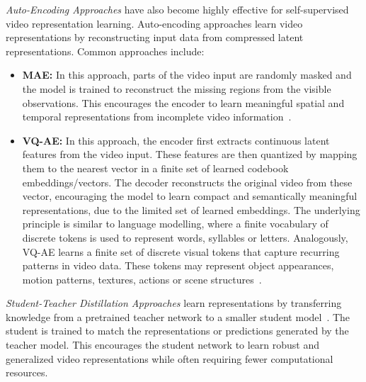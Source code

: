 \textit{Auto-Encoding Approaches} have also become highly effective for self-supervised video representation learning. Auto-encoding approaches learn video representations by reconstructing input data from compressed latent representations. Common approaches include:
\begin{itemize}
    \item \textbf{\ac{MAE}:} In this approach, parts of the video input are randomly masked and the model is trained to reconstruct the missing regions from the visible observations. This encourages the encoder to learn meaningful spatial and temporal representations from incomplete video information~\cite{Wang2023VideoMAEVS, Tong2022VideoMAEMA, Girdhar2022OmniMAESM}.
    
    \item \textbf{\ac{VQ-AE}:} 
    In this approach, the encoder first extracts continuous latent features from the video input. 
    These features are then quantized by mapping them to the nearest vector in a finite set of learned codebook embeddings/vectors. 
    The decoder reconstructs the original video from these vector, encouraging the model to learn compact and semantically meaningful representations, due to the limited set of learned embeddings. 
    The underlying principle is similar to language modelling, where a finite vocabulary of discrete tokens is used to represent words, syllables or letters. Analogously, \ac{VQ-AE} learns a finite set of discrete visual tokens that capture recurring patterns in video data. These tokens may represent object appearances, motion patterns, textures, actions or scene structures~\cite{Bruce2024GenieGI, Villegas2022PhenakiVL, Yu2022MAGVITMG, Yan2021VideoGPTVG, Seo2022HARPAL}. 
\end{itemize}

\textit{Student-Teacher Distillation Approaches} learn representations by transferring knowledge from a pretrained teacher network to a smaller student model~\cite{Zhao2024VideoPrismAF, Wang2022MaskedVD, Li2023UnmaskedTT}. The student is trained to match the representations or predictions generated by the teacher model. This encourages the student network to learn robust and generalized video representations while often requiring fewer computational resources.

